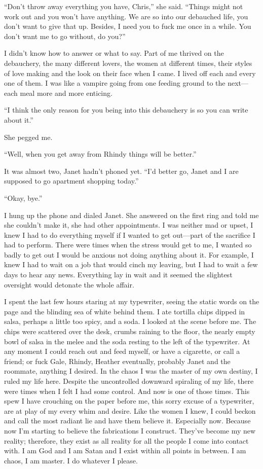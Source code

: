``Don't throw away everything you have, Chris,'' she said. ``Things
might not work out and you won't have anything. We are so into our
debauched life, you don't want to give that up. Besides, I need you to
fuck me once in a while. You don't want me to go without, do you?''

I didn't know how to answer or what to say. Part of me thrived on the
debauchery, the many different lovers, the women at different times,
their styles of love making and the look on their face when I came. I
lived off each and every one of them. I was like a vampire going from
one feeding ground to the next---each meal more and more enticing.

``I think the only reason for you being into this debauchery is so you
can write about it.''

She pegged me.

``Well, when you get away from Rhindy things will be better.''

It was almost two, Janet hadn't phoned yet. ``I'd better go, Janet and I
are supposed to go apartment shopping today.''

``Okay, bye.''

I hung up the phone and dialed Janet. She answered on the first ring and
told me she couldn't make it, she had other appointments. I was neither
mad or upset, I knew I had to do everything myself if I wanted to get
out---part of the sacrifice I had to perform. There were times when the
stress would get to me, I wanted so badly to get out I would be anxious
not doing anything about it. For example, I knew I had to wait on a job
that would cinch my leaving, but I had to wait a few days to hear any
news. Everything lay in wait and it seemed the slightest oversight would
detonate the whole affair.

I spent the last few hours staring at my typewriter, seeing the static
words on the page and the blinding sea of white behind them. I ate
tortilla chips dipped in salsa, perhaps a little too spicy, and a soda.
I looked at the scene before me. The chips were scattered over the desk,
crumbs raining to the floor, the nearly empty bowl of salsa in the melee
and the soda resting to the left of the typewriter. At any moment I
could reach out and feed myself, or have a cigarette, or call a friend;
or fuck Gale, Rhindy, Heather eventually, probably Janet and the
roommate, anything I desired. In the chaos I was the master of my own
destiny, I ruled my life here. Despite the uncontrolled downward
spiraling of my life, there were times when I felt I had some control.
And now is one of those times. This spew I have crouching on the paper
before me, this sorry excuse of a typewriter, are at play of my every
whim and desire. Like the women I knew, I could beckon and call the most
radiant lie and have them believe it. Especially now. Because now I'm
starting to believe the fabrications I construct. They've become my new
reality; therefore, they exist as all reality for all the people I come
into contact with. I am God and I am Satan and I exist within all points
in between. I am chaos, I am master. I do whatever I please.


